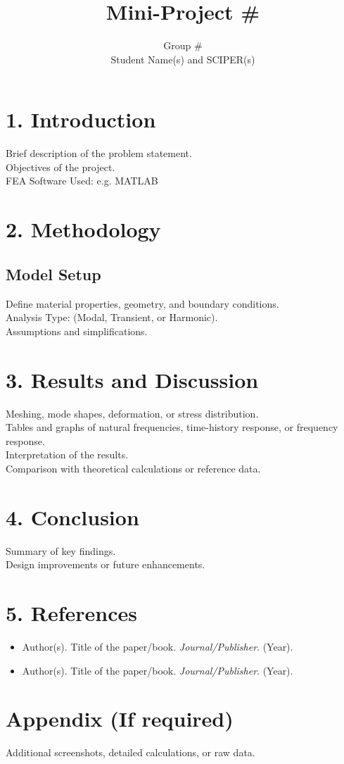 \documentclass[a4paper,12pt]{article}
\title{Mini-Project \# \\}
\author{Group \# \\ Student Name(s) and SCIPER(s)\\}
\date{}
\begin{document}
\maketitle

\section*{1. Introduction}
Brief description of the problem statement.\\
Objectives of the project.\\
FEA Software Used: e.g. MATLAB\\

\section*{2. Methodology}
\subsection*{Model Setup}
Define material properties, geometry, and boundary conditions.\\
Analysis Type: (Modal, Transient, or Harmonic).\\
Assumptions and simplifications.

\section*{3. Results and Discussion}
Meshing, mode shapes, deformation, or stress distribution.\\
Tables and graphs of natural frequencies, time-history response, or frequency response.\\
Interpretation of the results.\\
Comparison with theoretical calculations or reference data.

\section*{4. Conclusion}
Summary of key findings.\\
Design improvements or future enhancements.

\section*{5. References}
\begin{itemize}
    \item Author(s). Title of the paper/book. \textit{Journal/Publisher}. (Year).
    \item Author(s). Title of the paper/book. \textit{Journal/Publisher}. (Year). 
\end{itemize}

\section*{Appendix (If required)}
Additional screenshots, detailed calculations, or raw data.
\end{document}
